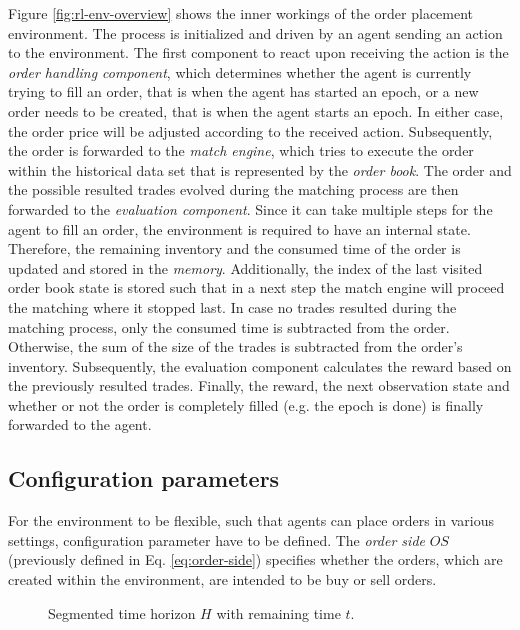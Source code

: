 Figure \ref{fig:rl-env-overview} shows the inner workings of the order placement environment.
The process is initialized and driven by an agent sending an action to the environment.
The first component to react upon receiving the action is the \textit{order handling component}, which determines whether the agent is currently trying to fill an order, that is when the agent has started an epoch, or a new order needs to be created, that is when the agent starts an epoch.
In either case, the order price will be adjusted according to the received action.
Subsequently, the order is forwarded to the \textit{match engine}, which tries to execute the order within the historical data set that is represented by the \textit{order book}.
The order and the possible resulted trades evolved during the matching process are then forwarded to the \textit{evaluation component}.
Since it can take multiple steps for the agent to fill an order, the environment is required to have an internal state.
Therefore, the remaining inventory and the consumed time of the order is updated and stored in the \textit{memory}.
Additionally, the index of the last visited order book state is stored such that in a next step the match engine will proceed the matching where it stopped last.
In case no trades resulted during the matching process, only the consumed time is subtracted from the order.
Otherwise, the sum of the size of the trades is subtracted from the order's inventory.
Subsequently, the evaluation component calculates the reward based on the previously resulted trades.
Finally, the reward, the next observation state and whether or not the order is completely filled (e.g. the epoch is done) is finally forwarded to the agent.

\subsection{Configuration parameters}

For the environment to be flexible, such that agents can place orders in various settings, configuration parameter have to be defined.
The \textit{order side} $OS$ (previously defined in Eq. \ref{eq:order-side}) specifies whether the orders, which are created within the environment, are intended to be buy or sell orders.

\begin{figure}[H]
    \centering
    \caption{Segmented time horizon $H$ with remaining time $t$.}
    \label{fig:setup-time-horizon}
\end{figure}

